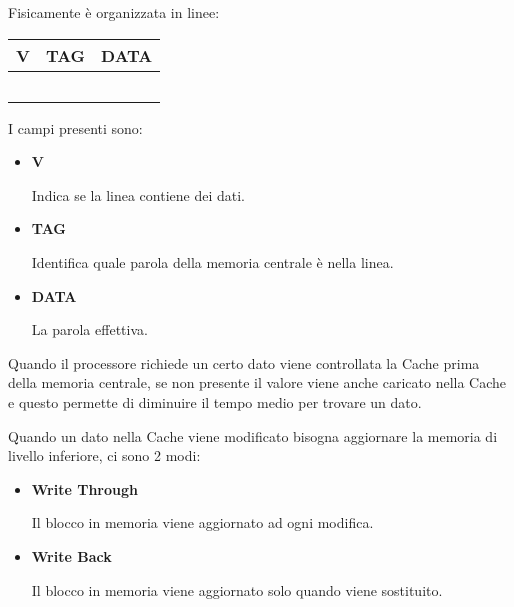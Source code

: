 \documentclass{article}
\begin{document}
\newpage

\noindent Fisicamente è organizzata in linee:

\begin{table}[ht]
    \centering
    \begin{tabular}{|c|c|c|}
        \multicolumn{1}{c}{V} & \multicolumn{1}{c}{TAG} & \multicolumn{1}{c}{DATA}\\
        \hline
         &  &\\
        \hline
         &  &\\
        \hline
         &  &\\
        \hline
         &  &\\
        \hline
         &  &\\
        \hline
    \end{tabular}
    \label{tab:cache}
\end{table}

I campi presenti sono:
\begin{itemize}
    \item \textbf{V}

        Indica se la linea contiene dei dati.
    
    \item \textbf{TAG}

        Identifica quale parola della memoria centrale è nella linea.
    
    \item \textbf{DATA}

        La parola effettiva.
    
\end{itemize}

\noindent Quando il processore richiede un certo dato viene controllata la Cache prima della memoria centrale, se non presente il valore viene anche caricato nella Cache e questo permette di diminuire il tempo medio per trovare un dato.\newline

\noindent Quando un dato nella Cache viene modificato bisogna aggiornare la memoria di livello inferiore, ci sono 2 modi:
\begin{itemize}
    \item \textbf{Write Through}

        Il blocco in memoria viene aggiornato ad ogni modifica.

    \item \textbf{Write Back}

        Il blocco in memoria viene aggiornato solo quando viene sostituito.\newline 
    
\end{itemize}
\end{document}
